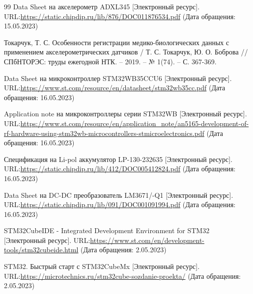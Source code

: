 \newpage
\renewcommand\refname{\centering СПИСОК ИСПОЛЬЗОВАННЫХ ИСТОЧНИКОВ}
\begin {thebibliography} {99}
Data Sheet на акселерометр ADXL345  [Электронный ресурс]. URL:\href{https://static.chipdip.ru/lib/876/DOC011876534.pdf}{https://static.chipdip.ru/lib/876/DOC011876534.pdf} (Дата обращения: 15.05.2023)

Токарчук, Т. С. Особенности регистрации медико-биологических данных с применением акселерометрических датчиков / Т. С. Токарчук, Ю. О. Боброва // СПбНТОРЭС: труды ежегодной НТК. – 2019. – № 1(74). – С. 367-369. 

Data Sheet на микроконтроллер STM32WB35CCU6  [Электронный ресурс]. URL:\href{https://www.st.com/resource/en/datasheet/stm32wb35cc.pdf}{https://www.st.com/resource/en/datasheet/stm32wb35cc.pdf} (Дата обращения: 16.05.2023)


Application note на микроконтроллеры серии STM32WB  [Электронный ресурс]. URL:\href{https://www.st.com/resource/en/application_note/an5165-development-of-rf-hardware-using-stm32wb-microcontrollers-stmicroelectronics.pdf}{https://www.st.com/resource/en/application\_note/an5165-development-of-rf-hardware-using-stm32wb-microcontrollers-stmicroelectronics.pdf} (Дата обращения: 16.05.2023)


Спецификация на Li-pol аккумулятор LP-130-232635  [Электронный ресурс]. URL:\href{https://static.chipdip.ru/lib/412/DOC005412824.pdf}{https://static.chipdip.ru/lib/412/DOC005412824.pdf} (Дата обращения: 16.05.2023)

Data Sheet на DC-DC преобразователь LM3671/-Q1  [Электронный ресурс]. URL:\href{https://static.chipdip.ru/lib/091/DOC001091994.pdf}{https://static.chipdip.ru/lib/091/DOC001091994.pdf} (Дата обращения: 16.05.2023)


STM32CubeIDE - Integrated Development Environment for STM32 [Электронный ресурс]. URL:\href{https://www.st.com/en/development-tools/stm32cubeide.html}{https://www.st.com/en/development-tools/stm32cubeide.html} (Дата обращения: 2.05.2023)


STM32. Быстрый старт с STM32CubeMx  [Электронный ресурс]. URL:\href{https://microtechnics.ru/stm32cube-sozdanie-proekta/}{https://microtechnics.ru/stm32cube-sozdanie-proekta/} (Дата обращения: 2.05.2023)







\end {thebibliography}



